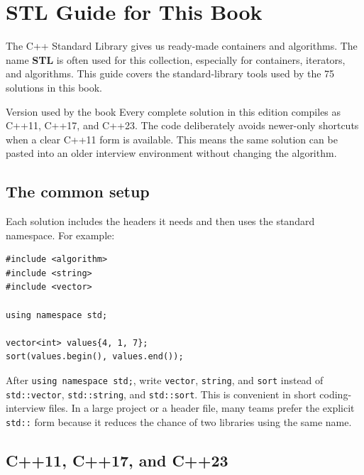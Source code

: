 
\clearpage
{}
\section*{STL Guide for This Book}

The C++ Standard Library gives us ready-made containers and algorithms. The
name \textbf{STL} is often used for this collection, especially for containers,
iterators, and algorithms. This guide covers the standard-library tools used
by the 75 solutions in this book.

\begin{conceptbox}{Version used by the book}
Every complete solution in this edition compiles as C++11, C++17, and C++23.
The code deliberately avoids newer-only shortcuts when a clear C++11 form is
available. This means the same solution can be pasted into an older interview
environment without changing the algorithm.
\end{conceptbox}

\subsection{The common setup}

Each solution includes the headers it needs and then uses the standard
namespace. For example:

\begin{lstlisting}
#include <algorithm>
#include <string>
#include <vector>

using namespace std;

vector<int> values{4, 1, 7};
sort(values.begin(), values.end());
\end{lstlisting}

After \texttt{using namespace std;}, write \texttt{vector}, \texttt{string},
and \texttt{sort} instead of \texttt{std::vector}, \texttt{std::string}, and
\texttt{std::sort}. This is convenient in short coding-interview files. In a
large project or a header file, many teams prefer the explicit \texttt{std::}
form because it reduces the chance of two libraries using the same name.

\subsection{C++11, C++17, and C++23}

